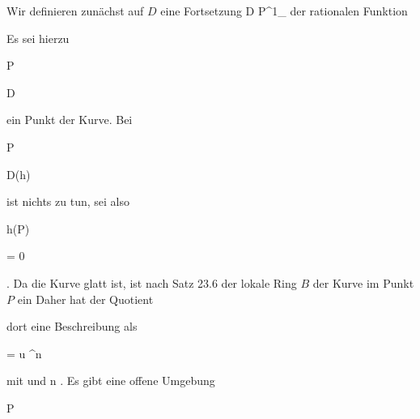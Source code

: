 {


Wir definieren zunächst auf $D$ eine Fortsetzung
\maabbdisp {\varphi} { D } { {\mathbb P}^{1}_{}
} {}
der rationalen Funktion

 Es sei hierzu


\mavergleichskette

{\vergleichskette

{ P
}

{ \in }{ D
}

{  }{
}

{    }{
}

{   }{
}

}
{}{}{}
ein Punkt der Kurve. Bei


\mavergleichskette

{\vergleichskette

{ P
}

{ \in }{ D(h)
}

{  }{
}

{    }{
}

{   }{
}

}
{}{}{}
ist nichts zu tun, sei also


\mavergleichskette

{\vergleichskette

{ h(P)
}

{ = }{ 0
}

{  }{
}

{    }{
}

{   }{
}

}
{}{}{.}
Da die Kurve glatt ist, ist nach
Satz 23.6
der lokale Ring $B$ der Kurve im Punkt $P$ ein
Daher hat der Quotient

 dort eine Beschreibung als


\mavergleichskettedisp

{\vergleichskette

{ 
}

{ =} { u \pi^n
}

{ } {
}

{ } {
}

{ } {
}

}
{}{}{}
mit   {  und  }  { n \in \Z  }{ }
 {} {.}
Es gibt eine offene Umgebung


\mavergleichskette

{\vergleichskette

{P
}

}}
